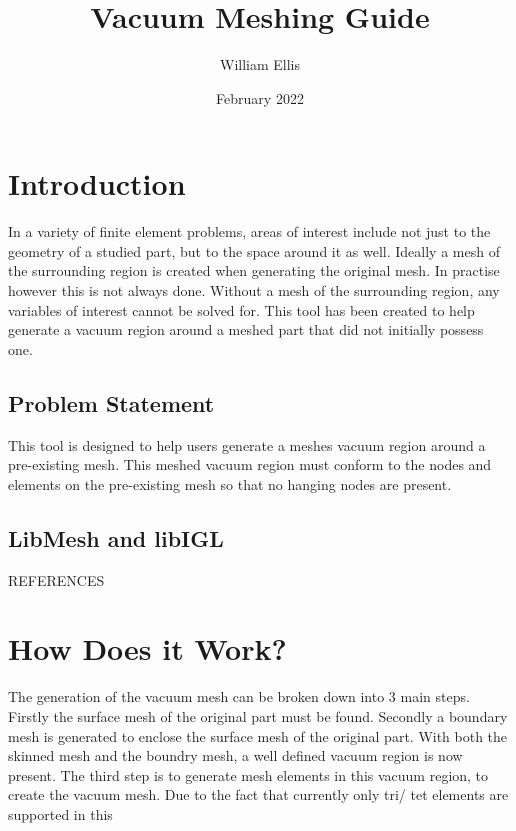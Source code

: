 \documentclass[12pt, letterpaper]{article}
\begin{document}
\begin{titlepage}
	\begin{center}
        \vspace*{1cm}	
		\title{Vacuum Meshing Guide}
		\author{William Ellis}
		\date{February 2022}   
		\maketitle
	\end{center}
\end{titlepage}

\maketitle
\section{Introduction}
In a variety of finite element problems, areas of interest include not just to the geometry of a studied part, but to the space around it as well. Ideally a mesh of the surrounding region is created when generating the original mesh. In practise however this is not always done. Without a mesh of the surrounding region, any variables of interest cannot be solved for. This tool has been created to help generate a vacuum region around a meshed part that did not initially possess one. 

\subsection{Problem Statement}
This tool is designed to help users generate a meshes vacuum region around a pre-existing mesh. This meshed vacuum region must conform to the nodes and elements on the pre-existing mesh so that no hanging nodes are present. 

\subsection{LibMesh and libIGL}
REFERENCES

\section{How Does it Work?}
The generation of the vacuum mesh can be broken down into 3 main steps. Firstly the surface mesh of the original part must be found. Secondly a boundary mesh is generated to enclose the surface mesh of the original part.  With both the skinned mesh and the boundry mesh, a well defined vacuum region is now present. The third step is to generate mesh elements in this vacuum region, to create the vacuum mesh. Due to the fact that currently only tri/ tet elements are supported in this 
\end{document}

